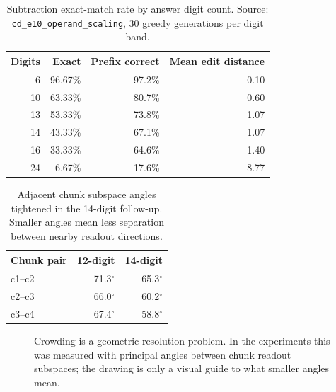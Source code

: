 \documentclass[acmsmall,screen,nonacm]{acmart}
\begin{document}
\begin{table}[t]
  \caption{Subtraction exact-match rate by answer digit count. Source:
  \texttt{cd\_e10\_operand\_scaling}, 30 greedy generations per digit band.}
  \label{tab:digitscaling}
  \centering
  \begin{tabular}{rrrr}
    \toprule
    Digits & Exact & Prefix correct & Mean edit distance \\
    \midrule
    6 & 96.67\% & 97.2\% & 0.10 \\
    10 & 63.33\% & 80.7\% & 0.60 \\
    13 & 53.33\% & 73.8\% & 1.07 \\
    14 & 43.33\% & 67.1\% & 1.07 \\
    16 & 33.33\% & 64.6\% & 1.40 \\
    24 & 6.67\% & 17.6\% & 8.77 \\
    \bottomrule
  \end{tabular}
\end{table}

\begin{table}[t]
  \caption{Adjacent chunk subspace angles tightened in the 14-digit follow-up.
  Smaller angles mean less separation between nearby readout directions.}
  \label{tab:chunkangles}
  \centering
  \begin{tabular}{lrr}
    \toprule
    Chunk pair & 12-digit & 14-digit \\
    \midrule
    c1--c2 & 71.3$^\circ$ & 65.3$^\circ$ \\
    c2--c3 & 66.0$^\circ$ & 60.2$^\circ$ \\
    c3--c4 & 67.4$^\circ$ & 58.8$^\circ$ \\
    \bottomrule
  \end{tabular}
\end{table}

\begin{figure}[t]
  \centering
  \caption{Crowding is a geometric resolution problem. In the experiments this
  was measured with principal angles between chunk readout subspaces; the
  drawing is only a visual guide to what smaller angles mean.}
\end{figure}
\end{document}
